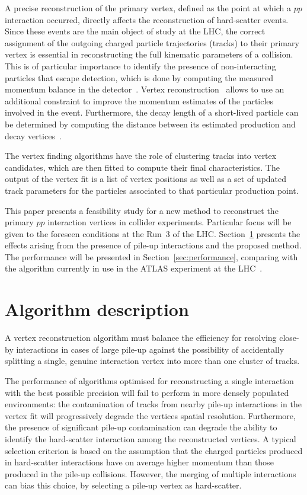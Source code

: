 \documentclass[a4paper,11pt]{article}
\begin{document}
A precise reconstruction of the primary vertex, defined as the point at which a $pp$ interaction occurred, directly affects the reconstruction of hard-scatter events. Since these events are the main object of study at the LHC, the correct assignment of the outgoing charged particle trajectories (tracks) to their primary vertex is essential in reconstructing the full kinematic parameters of a collision. This is of particular importance to identify the presence of non-interacting particles that escape detection, which is done by computing the measured momentum balance in the detector~\cite{Aad:2016nrq,ATL-PHYS-PUB-2015-027,Khachatryan:2014gga}. Vertex reconstruction~\cite{Aaboud:2016rmg,Chatrchyan:2014fea,Schluter:2014uea} allows to use an additional constraint to improve the momentum estimates of the particles involved in the event. Furthermore, the decay length of a short-lived particle can be determined by computing the distance between its estimated production and decay vertices~\cite{Aad:2015ydr,Chatrchyan:2012jua}.

The vertex finding algorithms have the role of clustering tracks into vertex candidates, which are then fitted to compute their final characteristics. The output of the vertex fit is a list of vertex positions as well as a set of updated track parameters for the particles associated to that particular production point.

This paper presents a feasibility study for a new method to reconstruct the primary $pp$ interaction vertices in collider experiments. Particular focus will be given to the foreseen conditions at the Run~3 of the LHC. Section~\ref{sec:algo} presents the effects arising from the presence of pile-up interactions and the proposed method. The performance will be presented in Section~\ref{sec:performance}, comparing with the algorithm currently in use in the ATLAS experiment at the LHC~\cite{ATL-PHYS-PUB-2015-026}.

\section{Algorithm description}
\label{sec:algo}

A vertex reconstruction algorithm must balance the efficiency for resolving close-by interactions in cases of large pile-up against the possibility of accidentally splitting a single, genuine interaction vertex into more than one cluster of tracks.

The performance of algorithms optimised for reconstructing a single interaction with the best possible precision will fail to perform in more densely populated environments: the contamination of tracks from nearby pile-up interactions in the vertex fit will progressively degrade the vertices spatial resolution. Furthermore, the presence of significant pile-up contamination can degrade the ability to identify the hard-scatter interaction among the reconstructed vertices. A typical selection criterion is based on the assumption that the charged particles produced in hard-scatter interactions have on average higher momentum than those produced in the pile-up collisions. However, the merging of multiple interactions can bias this choice, by selecting a pile-up vertex as hard-scatter.
\end{document}
